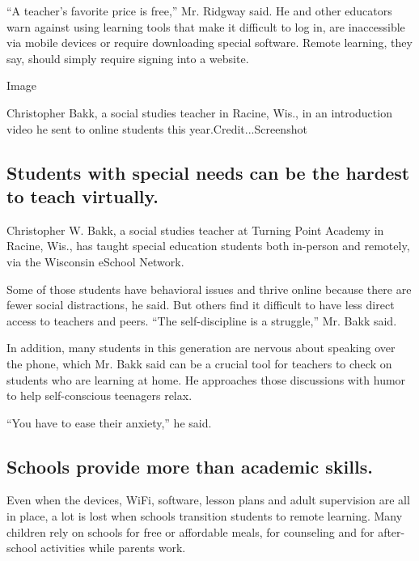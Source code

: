 ``A teacher's favorite price is free,'' Mr. Ridgway said. He and other
educators warn against using learning tools that make it difficult to
log in, are inaccessible via mobile devices or require downloading
special software. Remote learning, they say, should simply require
signing into a website.

Image

Christopher Bakk, a social studies teacher in Racine, Wis., in an
introduction video he sent to online students this
year.Credit...Screenshot

\hypertarget{students-with-special-needs-can-be-the-hardest-to-teach-virtually}{%
\subsection{Students with special needs can be the hardest to teach
virtually.}\label{students-with-special-needs-can-be-the-hardest-to-teach-virtually}}

Christopher W. Bakk, a social studies teacher at Turning Point Academy
in Racine, Wis., has taught special education students both in-person
and remotely, via the Wisconsin eSchool Network.

Some of those students have behavioral issues and thrive online because
there are fewer social distractions, he said. But others find it
difficult to have less direct access to teachers and peers. ``The
self-discipline is a struggle,'' Mr. Bakk said.

In addition, many students in this generation are nervous about speaking
over the phone, which Mr. Bakk said can be a crucial tool for teachers
to check on students who are learning at home. He approaches those
discussions with humor to help self-conscious teenagers relax.

``You have to ease their anxiety,'' he said.

\hypertarget{schools-provide-more-than-academic-skills}{%
\subsection{Schools provide more than academic
skills.}\label{schools-provide-more-than-academic-skills}}

Even when the devices, WiFi, software, lesson plans and adult
supervision are all in place, a lot is lost when schools transition
students to remote learning. Many children rely on schools for free or
affordable meals, for counseling and for after-school activities while
parents work.

